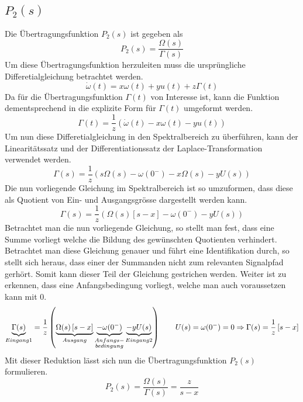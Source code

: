 \subsection{$P_2(s)$}
Die Übertragungsfunktion $P_2(s)$ ist gegeben als
\[
	P_2(s) = \frac{\Omega(s)}{\Gamma(s)}
\]
Um diese Übertragungsfunktion herzuleiten muss die ursprüngliche
Differetialgleichung betrachtet werden.
\[
	\dot\omega(t) = x \omega(t) + y u(t) + z \Gamma(t)
\]
Da für die Übertragungsfunktion $\Gamma(t)$ von Interesse ist, kann die
Funktion dementsprechend in die explizite Form für $\Gamma(t)$ umgeformt
werden.
\[
	\Gamma(t) = \frac{1}{z} \left(
			\dot\omega(t) - x \omega(t) - y u(t)
		\right)
\]
Um nun diese Differetialgleichung in den Spektralbereich zu überführen, kann
der Linearitätssatz und der Differentiationssatz der Laplace-Transformation
verwendet werden.
\[
	\Gamma(s) = \frac{1}{z} \left(
			s \Omega(s) - \omega(0^-) - x \Omega(s) - y U(s)
		\right)
\]
Die nun vorliegende Gleichung im Spektralbereich ist so umzuformen, dass diese
als Quotient von Ein- und Ausgangsgrösse dargestellt werden kann.
\[
	\Gamma(s) = \frac{1}{z} \left(
			\Omega(s) \left[ s-x \right] - \omega(0^-) - y U(s)
		\right)
\]
Betrachtet man die nun vorliegende Gleichung, so stellt man fest, dass eine
Summe vorliegt welche die Bildung des gewünschten Quotienten verhindert.
Betrachtet man diese Gleichung genauer und führt eine Identifikation durch, so
stellt sich heraus, dass einer der Summanden nicht zum relevanten Signalpfad
gerhört. Somit kann dieser Teil der Gleichung gestrichen werden. Weiter ist
zu erkennen, dass eine Anfangsbedingung vorliegt, welche man auch voraussetzen
kann mit 0.
\[
	\underbrace{\Gamma(s)}_{Eingang 1} = \frac{1}{z} \left(
			\underbrace{\Omega(s) \left[ s-x \right]}_{Ausgang}
			\underbrace{- \omega(0^-)}_{\begin{subarray}{c}Anfangs-\\ bedingung\end{subarray}}
			\underbrace{- y U(s)}_{Eingang 2}
		\right)
	\qquad U(s) = \omega(0^-) = 0 \Rightarrow \Gamma(s) =
		\frac{1}{z} \left[ s-x \right]
\]
Mit dieser Reduktion lässt sich nun die Übertragungsfunktion $P_2(s)$
formulieren.
\[
	P_2(s) = \frac{\Omega(s)}{\Gamma(s)} = \frac{z}{s-x}
\]
